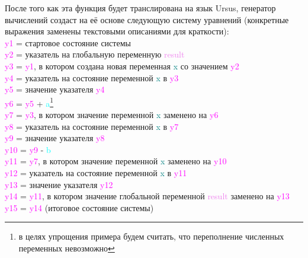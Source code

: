 \documentclass[../thesis.tex]{subfiles}
\begin{document}
После того как эта функция будет транслирована на язык Ursus, генератор вычислений создаст на её основе следующую систему уравнений (конкретные выражения заменены текстовыми описаниями для краткости):
\bigskip\\
\newenvironment{allintypewriter}{\ttfamily}{}\begin{allintypewriter}\textcolor{magenta}{y1} = стартовое состояние системы\\
\textcolor{magenta}{y2} = указатель на глобальную переменную \textcolor{violet}{result}\\
\textcolor{magenta}{y3} = \textcolor{magenta}{y1}, в котором создана новая переменная \textcolor{teal}{x} со значением \textcolor{magenta}{y2}\\
\textcolor{magenta}{y4} = указатель на состояние переменной \textcolor{teal}{x} в \textcolor{magenta}{y3}\\
\textcolor{magenta}{y5} = значение указателя \textcolor{magenta}{y4}\\
\textcolor{magenta}{y6} = \textcolor{magenta}{y5} + \textcolor{cyan}{a}\footnote{в целях упрощения примера будем считать, что переполнение численных переменных невозможно}\\
\textcolor{magenta}{y7} = \textcolor{magenta}{y3}, в котором значение переменной \textcolor{teal}{x} заменено на \textcolor{magenta}{y6}\\
\textcolor{magenta}{y8} = указатель на состояние переменной \textcolor{teal}{x} в \textcolor{magenta}{y7}\\
\textcolor{magenta}{y9} = значение указателя \textcolor{magenta}{y8}\\
\textcolor{magenta}{y10} = \textcolor{magenta}{y9} - \textcolor{cyan}{b}\footnotemark[1]\\
\textcolor{magenta}{y11} = \textcolor{magenta}{y7}, в котором значение переменной \textcolor{teal}{x} заменено на \textcolor{magenta}{y10}\\
\textcolor{magenta}{y12} = указатель на состояние переменной \textcolor{teal}{x} в \textcolor{magenta}{y11}\\
\textcolor{magenta}{y13} = значение указателя \textcolor{magenta}{y12}\\
\textcolor{magenta}{y14} = \textcolor{magenta}{y11}, в котором значение глобальной переменной \textcolor{violet}{result} заменено на \textcolor{magenta}{y13}\\
\textcolor{magenta}{y15} = \textcolor{magenta}{y14} (итоговое состояние системы)
\end{allintypewriter}
\bigskip
\end{document}
